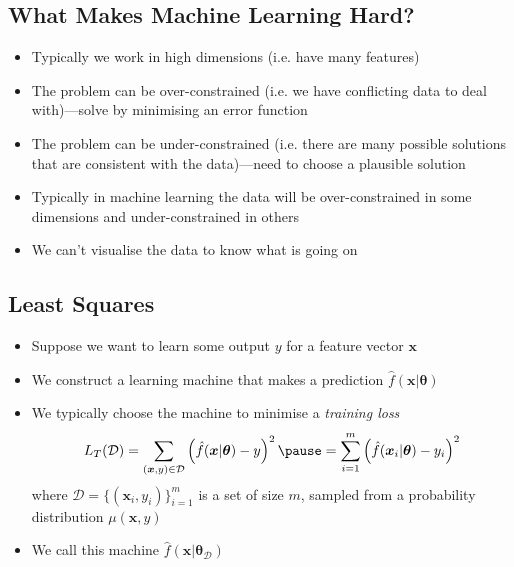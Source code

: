 
\begin{slide}
\section{What Makes Machine Learning Hard?}

\begin{PauseHighLight}
  \begin{itemize}
  \item Typically we work in high dimensions (i.e. have many
    features)\pause
  \item The problem can be over-constrained (i.e. we have conflicting
    data to deal with)\pause---solve by minimising an error function\pauseb
  \item The problem can be under-constrained (i.e. there are many
    possible solutions that are consistent with the data)\pause---need to
    choose a plausible solution\pauseb
  \item Typically in machine learning the data will be over-constrained
    in some dimensions and under-constrained in others\pause
  \item We can't visualise the data to know what is going
    on\pause
  \end{itemize}
\end{PauseHighLight}

\end{slide}


\begin{slide}
\section{Least Squares}

\begin{PauseHighLight}
  \begin{itemize}
  \item Suppose we want to learn some output $y$ for a feature vector $\bm{x}$\pause
  \item We construct a learning machine that makes a prediction
    $\hat{f}(\bm{x}|\bm{\theta})$\pause
  \item We typically choose the machine to  minimise a \textit{training loss}
    \begin{align*}
      L_T(\mathcal{D}) = \sum_{(\bm{x},y)\in\mathcal{D}} \left(
      \hat{f}(\bm{x}|\bm{\theta}) - y \right)^2 \pause
      = \sum_{i=1}^m \left(
      \hat{f}(\bm{x}_i|\bm{\theta}) - y_i \right)^2
    \end{align*}
    where $\mathcal{D} = \{(\bm{x}_i, y_i)\}_{i=1}^m$ is a set of
    size $m$, sampled from a probability distribution $\mu(\bm{x},y)$\pauseb
  \item We call this machine $\hat{f}(\bm{x}\vert \bm{\theta}_\mathcal{D})$\pauseb
  \end{itemize}
\end{PauseHighLight}

\end{slide}


